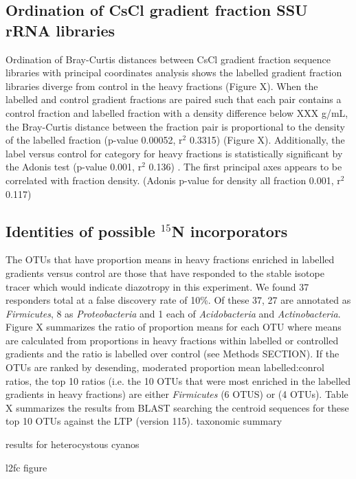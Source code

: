 \subsection{Ordination of CsCl gradient fraction SSU rRNA libraries}
Ordination of Bray-Curtis \cite{Bray_1957} distances between CsCl gradient fraction sequence libraries with principal coordinates analysis shows the labelled gradient fraction libraries diverge from control in the heavy fractions (Figure X). When the labelled and control gradient fractions are paired such that each pair contains a control fraction and labelled fraction with a density difference below XXX g/mL, the Bray-Curtis distance between the fraction pair is proportional to the density of the labelled fraction (p-value 0.00052, r$^{2}$ 0.3315) (Figure X). Additionally, the label versus control for category for heavy fractions is statistically significant by the Adonis test (p-value 0.001, r$^{2}$ 0.136) \cite{Anderson_2001}. The first principal axes appears to be correlated with fraction density. (Adonis p-value for density all fraction 0.001, r$^{2}$ 0.117)

\subsection{Identities of possible $^{15}$N incorporators}
The OTUs that have proportion means in heavy fractions enriched in labelled gradients versus control are those that have responded to the stable isotope tracer which would indicate diazotropy in this experiment. We found 37 responders total at a false discovery rate of 10\%. Of these 37, 27 are annotated as \textit{Firmicutes}, 8 as \textit{Proteobacteria} and 1 each of \textit{Acidobacteria} and \textit{Actinobacteria}. Figure X summarizes the ratio of proportion means for each OTU where means are calculated from proportions in heavy fractions within labelled or controlled gradients and the ratio is labelled over control (see Methods SECTION). If the OTUs are ranked by desending, moderated proportion mean labelled:conrol ratios, the top 10 ratios (i.e. the 10 OTUs that were most enriched in the labelled gradients in heavy fractions) are either \textit{Firmicutes} (6 OTUS) or  (4 OTUs). Table X summarizes the results from BLAST searching the centroid sequences for these top 10 OTUs against the LTP (version 115).  
taxonomic summary

results for heterocystous cyanos

l2fc figure

